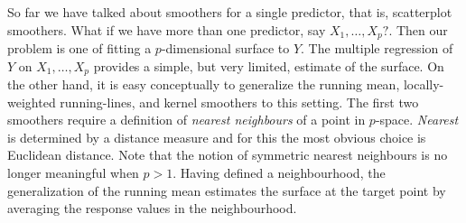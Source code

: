 So far we have talked about smoothers for a single predictor, that is,
scatterplot smoothers.
What if we have more than one predictor, say $X_1,\ldots, X_p?$.
Then our problem is one of fitting a $p$-dimensional surface to $Y$.
%
The multiple regression of $Y$ on $X_1,\ldots, X_p$ provides a
simple, but very limited, estimate of the surface.
%
%
On the other hand,
it is easy conceptually  to generalize the running mean,  locally-weighted 
running-lines, and kernel smoothers to this setting.
%
The first two smoothers require a definition of {\sl nearest neighbours}
of a point in $p$-space.
%
%
{\sl Nearest} is determined by a distance measure and for this 
the most obvious choice is Euclidean distance.
%
Note that the notion of symmetric nearest neighbours is no longer meaningful
when $p > 1$.
%
%
Having defined a neighbourhood,
the generalization of the running mean estimates
 the surface at the target point by averaging the
response values in the neighbourhood.


